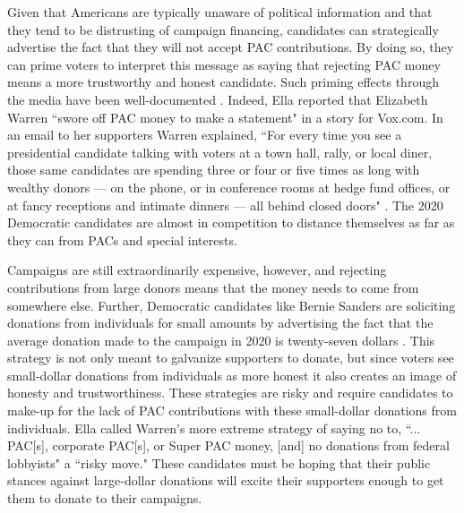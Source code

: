 \documentclass[12pt]{article}
\begin{document}
 Given that Americans are typically unaware of political information and that they tend to be distrusting of campaign financing, candidates can strategically advertise the fact that they will not accept PAC contributions. By doing so, they can prime voters to interpret this message as saying that rejecting PAC money means a more trustworthy and honest candidate. Such priming effects through the media have been well-documented \citep{iyengar_news_1989}. Indeed, Ella \citet{nilsen_race_2019} reported that Elizabeth Warren ``swore off PAC money to make a statement" in a story for Vox.com. In an email to her supporters Warren explained, ``For every time you see a presidential candidate talking with voters at a town hall, rally, or local diner, those same candidates are spending three or four or five times as long with wealthy donors — on the phone, or in conference rooms at hedge fund offices, or at fancy receptions and intimate dinners — all behind closed doors" \citep{nilsen_race_2019}. The 2020 Democratic candidates are almost in competition to distance themselves as far as they can from PACs and special interests. 
 
 Campaigns are still extraordinarily expensive, however, and rejecting contributions from large donors means that the money needs to come from somewhere else. Further, Democratic candidates like Bernie Sanders are soliciting donations from individuals for small amounts by advertising the fact that the average donation made to the campaign in 2020 is twenty-seven dollars \citep{gambino_not_2019}. This strategy is not only meant to galvanize supporters to donate, but since voters see small-dollar donations from individuals as more honest \citep{bowler_campaign_2016} it also creates an image of honesty and trustworthiness. These strategies are risky and require candidates to make-up for the lack of PAC contributions with these small-dollar donations from individuals. Ella \citet{nilsen_race_2019} called Warren's more extreme strategy of saying no to, ``... PAC[s], corporate PAC[s], or Super PAC money, [and] no donations from federal lobbyists" a ``risky move." These candidates must be hoping that their public stances against large-dollar donations will excite their supporters enough to get them to donate to their campaigns.





\pagebreak
\singlespacing
{}
%
\printbibliography
\pagebreak


\begin{appendices}



\end{appendices}
\end{document}
